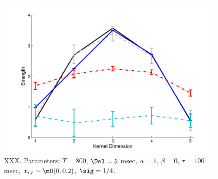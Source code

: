\begin{figure}[H]
\centering \includegraphics[width=.9\linewidth]{../figs/kernel}
\caption{XXX. Parameters: $T=800$, $\Del=5$ msec, $\alpha=1$, $\beta=0$, $\tau=100$ msec, $x_{i,t} \sim \mU(0,0.2)$,  $\sig=1/4$.} \label{fig:kernel}
\end{figure}



